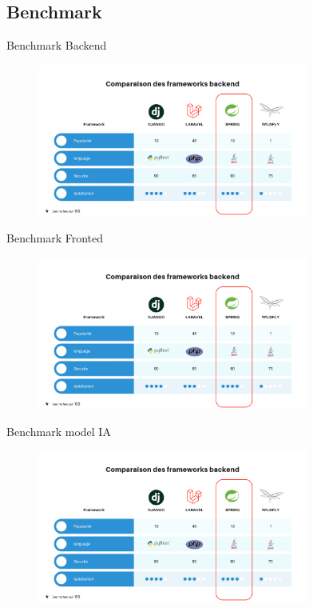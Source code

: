 \documentclass{beamer}
\begin{document}
\subsection{Benchmark}
\begin{frame}{Benchmark Backend}
   \begin{figure}[htpb]
        \centering
        \includegraphics[height=5cm]{pic/benchmark.png}
    \end{figure}
\end{frame}

\begin{frame}{Benchmark Fronted}
    \begin{figure}[htpb]
         \centering
         \includegraphics[height=5cm]{pic/benchmark.png}
     \end{figure}
 \end{frame}

 \begin{frame}{Benchmark model IA}
    \begin{figure}[htpb]
         \centering
         \includegraphics[height=5cm]{pic/benchmark.png}
     \end{figure}
 \end{frame}
\end{document}
